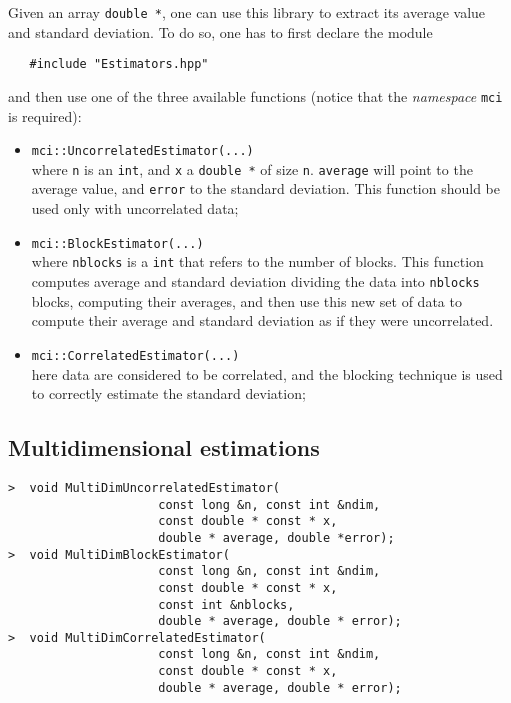 \documentclass[11pt,a4paper,twoside]{article}
\begin{document}
Given an array \verb+double *+, one can use this library to extract its average value and standard deviation.
To do so, one has to first declare the module
\begin{verbatim}
   #include "Estimators.hpp"
\end{verbatim}
and then use one of the three available functions (notice that the \emph{namespace} \verb+mci+ is required):
\begin{itemize}
\item \verb+mci::UncorrelatedEstimator(...)+ \\ where \verb+n+ is an \verb+int+, and \verb+x+ a \verb+double *+ of size \verb+n+. \verb+average+ will point to the average value, and \verb+error+ to the standard deviation. This function should be used only with uncorrelated data;
\item \verb+mci::BlockEstimator(...)+ \\ where \verb+nblocks+ is a \verb+int+ that refers to the number of blocks. This function computes average and standard deviation dividing the data into \verb+nblocks+ blocks, computing their averages, and then use this new set of data to compute their average and standard deviation as if they were uncorrelated.
\item \verb+mci::CorrelatedEstimator(...)+ \\ here data are considered to be correlated, and the blocking technique is used to correctly estimate the standard deviation;
\end{itemize}


\subsection{Multidimensional estimations} %
\label{sub:multidimensional_estimations}

\begin{verbatim}
>  void MultiDimUncorrelatedEstimator(
                     const long &n, const int &ndim,
                     const double * const * x,
                     double * average, double *error);
>  void MultiDimBlockEstimator(
                     const long &n, const int &ndim,
                     const double * const * x,
                     const int &nblocks,
                     double * average, double * error);
>  void MultiDimCorrelatedEstimator(
                     const long &n, const int &ndim,
                     const double * const * x,
                     double * average, double * error);
\end{verbatim}
\end{document}
